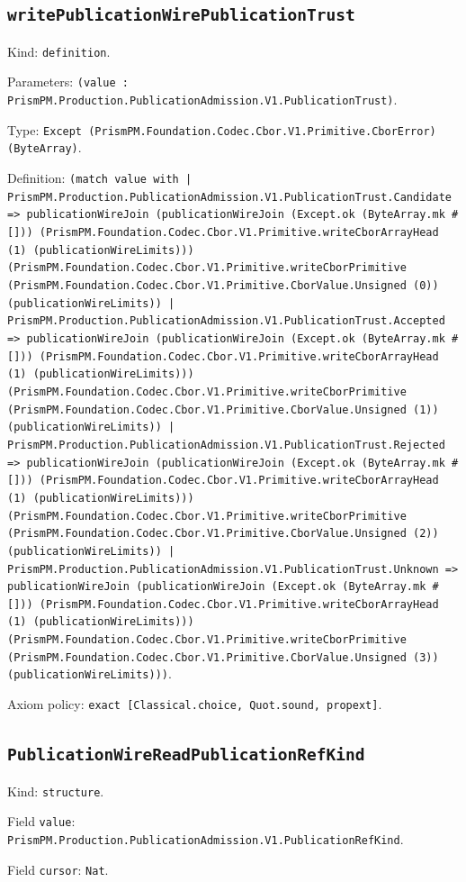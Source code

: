 \documentclass[11pt]{article}
\begin{document}
\subsection*{\texttt{writePublicationWirePublicationTrust}}
\noindent Kind: \texttt{definition}.\par
\noindent Parameters: \texttt{(value : PrismPM.Production.PublicationAdmission.V1.PublicationTrust)}.\par
\noindent Type: \texttt{Except (PrismPM.Foundation.Codec.Cbor.V1.Primitive.CborError) (ByteArray)}.\par
\noindent Definition: \texttt{(match value with | PrismPM.Production.PublicationAdmission.V1.PublicationTrust.Candidate => publicationWireJoin (publicationWireJoin (Except.ok (ByteArray.mk \#[])) (PrismPM.Foundation.Codec.Cbor.V1.Primitive.writeCborArrayHead (1) (publicationWireLimits))) (PrismPM.Foundation.Codec.Cbor.V1.Primitive.writeCborPrimitive (PrismPM.Foundation.Codec.Cbor.V1.Primitive.CborValue.Unsigned (0)) (publicationWireLimits)) | PrismPM.Production.PublicationAdmission.V1.PublicationTrust.Accepted => publicationWireJoin (publicationWireJoin (Except.ok (ByteArray.mk \#[])) (PrismPM.Foundation.Codec.Cbor.V1.Primitive.writeCborArrayHead (1) (publicationWireLimits))) (PrismPM.Foundation.Codec.Cbor.V1.Primitive.writeCborPrimitive (PrismPM.Foundation.Codec.Cbor.V1.Primitive.CborValue.Unsigned (1)) (publicationWireLimits)) | PrismPM.Production.PublicationAdmission.V1.PublicationTrust.Rejected => publicationWireJoin (publicationWireJoin (Except.ok (ByteArray.mk \#[])) (PrismPM.Foundation.Codec.Cbor.V1.Primitive.writeCborArrayHead (1) (publicationWireLimits))) (PrismPM.Foundation.Codec.Cbor.V1.Primitive.writeCborPrimitive (PrismPM.Foundation.Codec.Cbor.V1.Primitive.CborValue.Unsigned (2)) (publicationWireLimits)) | PrismPM.Production.PublicationAdmission.V1.PublicationTrust.Unknown => publicationWireJoin (publicationWireJoin (Except.ok (ByteArray.mk \#[])) (PrismPM.Foundation.Codec.Cbor.V1.Primitive.writeCborArrayHead (1) (publicationWireLimits))) (PrismPM.Foundation.Codec.Cbor.V1.Primitive.writeCborPrimitive (PrismPM.Foundation.Codec.Cbor.V1.Primitive.CborValue.Unsigned (3)) (publicationWireLimits)))}.\par
\noindent Axiom policy: \texttt{exact [Classical.choice, Quot.sound, propext]}.\par
\subsection*{\texttt{PublicationWireReadPublicationRefKind}}
\noindent Kind: \texttt{structure}.\par
\noindent Field \texttt{value}: \texttt{PrismPM.Production.PublicationAdmission.V1.PublicationRefKind}.\par
\noindent Field \texttt{cursor}: \texttt{Nat}.\par
\end{document}
